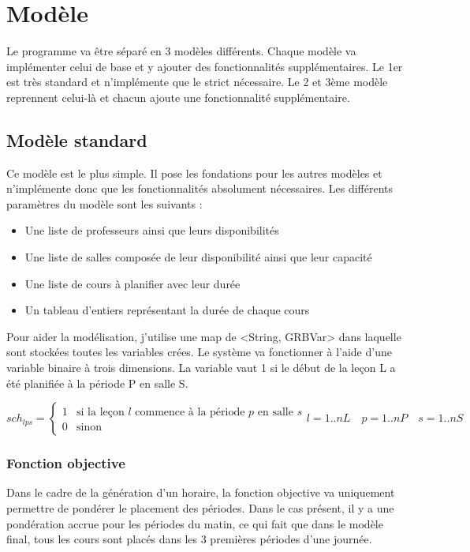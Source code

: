 \section{Modèle}
Le programme va être séparé en 3 modèles différents. Chaque modèle va implémenter celui de base et y ajouter des fonctionnalités supplémentaires. Le 1er est très standard et n'implémente que le strict nécessaire. Le 2 et 3ème modèle reprennent celui-là et chacun ajoute une fonctionnalité supplémentaire.

\subsection{Modèle standard}
Ce modèle est le plus simple. Il pose les fondations pour les autres modèles et n'implémente donc que les fonctionnalités absolument nécessaires. Les différents paramètres du modèle sont les suivants :

\begin{itemize}
\item Une liste de professeurs ainsi que leurs disponibilités
\item Une liste de salles composée de leur disponibilité ainsi que leur capacité
\item Une liste de cours à planifier avec leur durée
\item Un tableau d'entiers représentant la durée de chaque cours
\end{itemize}

Pour aider la modélisation, j'utilise une map de <String, GRBVar> dans laquelle sont stockées toutes les variables crées. Le système va fonctionner à l'aide d'une variable binaire à trois dimensions. La variable vaut 1 si le début de la leçon L a été planifiée à la période P en salle S.

\begin{equation*}
sch_{lps} =
\begin{cases}
1 & \text{si la leçon $l$ commence à la période $p$ en salle $s$} \\
0 & \text{sinon}
\end{cases}
l = 1 .. nL \quad p = 1 .. nP \quad s = 1 .. nS
\end{equation*}

\subsubsection{Fonction objective}
Dans le cadre de la génération d'un horaire, la fonction objective va uniquement permettre de pondérer le placement des périodes. Dans le cas présent, il y a une pondération accrue pour les périodes du matin, ce qui fait que dans le modèle final, tous les cours sont placés dans les 3 premières périodes d'une journée.

